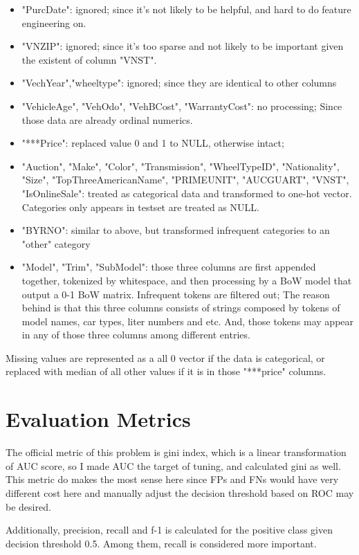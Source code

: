 \documentclass[a4paper]{article}
\begin{document}
\begin{itemize}
\item "PurcDate": ignored; since it's not likely to be helpful, and hard to do feature engineering on.
\item "VNZIP": ignored; since it's too sparse and not likely to be important given the existent of column "VNST".
\item "VechYear","wheeltype": ignored; since they are identical to other columns
\item "VehicleAge", "VehOdo", "VehBCost", "WarrantyCost": no processing; Since those data are already ordinal numerics.
\item "***Price": replaced value 0 and 1 to NULL, otherwise intact;
\item "Auction", "Make", "Color", "Transmission", "WheelTypeID", "Nationality", "Size", "TopThreeAmericanName", "PRIMEUNIT", "AUCGUART", "VNST", "IsOnlineSale": treated as categorical data and transformed to one-hot vector. Categories only appears in testset are treated as NULL.
\item "BYRNO": similar to above, but transformed infrequent categories to an "other" category
\item "Model", "Trim", "SubModel": those three columns are first appended together, tokenized by whitespace, and then processing by a BoW model that output a 0-1 BoW matrix. Infrequent tokens are filtered out; The reason behind is that this three columns consists of strings composed by tokens of model names, car types, liter numbers and etc. And, those tokens may appear in any of those three columns among different entries.
\end{itemize}

Missing values are represented as a all 0 vector if the data is categorical, or replaced with median of all other values if it is in those "***price" columns.

\section{Evaluation Metrics}
The official metric of this problem is gini index, which is a linear transformation of AUC score, so I made AUC the target of tuning, and calculated gini as well. This metric do makes the most sense here since FPs and FNs would have very different cost here and manually adjust the decision threshold based on ROC may be desired.

Additionally, precision, recall and f-1 is calculated for the positive class given decision threshold 0.5. Among them, recall is considered more important.
\end{document}
